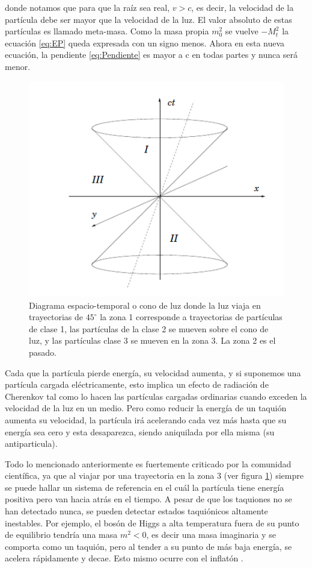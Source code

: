 \documentclass[twocolumn,preprintnumbers,amsmath,amssymb]{revtex4}
\begin{document}
donde notamos que para que la raíz sea real, $v>c$, es decir, la velocidad de la partícula debe ser mayor que la velocidad de la luz. El valor absoluto de estas partículas es llamado meta-masa. Como la masa propia $m_0^2$ se vuelve $-M_t^2$ la ecuación \eqref{eq:EP} queda expresada con un signo menos. Ahora en esta nueva ecuación, la pendiente \eqref{eq:Pendiente} es mayor a c en todas partes y nunca será menor.

\begin{figure}[htb!]
\centering
\includegraphics[width=0.9\columnwidth]{conodeluz2.png}
\caption{ Diagrama espacio-temporal o cono de luz donde la luz viaja en trayectorias de $45^{\circ}$ la zona 1 corresponde a trayectorias de partículas de clase 1, las partículas de la clase 2 se mueven sobre el cono de luz, y las partículas clase 3 se mueven en la zona 3. La zona 2 es el pasado.}
\label{fig:cono}
\end{figure}

Cada que la partícula pierde energía, su velocidad aumenta, y si suponemos una partícula cargada eléctricamente, esto implica un efecto de radiación de Cherenkov tal como lo hacen las partículas cargadas ordinarias cuando exceden la velocidad de la luz en un medio. Pero como reducir la energía de un taquión aumenta su velocidad, la partícula irá acelerando cada vez más hasta que su energía sea cero y esta desaparezca, siendo aniquilada por ella misma (su antiparticula).


Todo lo mencionado anteriormente es fuertemente criticado por la comunidad científica, ya que al viajar por una trayectoria en la zona 3 (ver figura \ref{fig:cono}) siempre se puede hallar un sistema de referencia en el cuál la partícula tiene energía positiva pero van hacia atrás en el tiempo.
A pesar de que los taquiones no se han detectado nunca, se pueden detectar estados taquiónicos altamente inestables. Por ejemplo, el bosón de Higgs a alta temperatura fuera de su punto de equilibrio tendría una masa $m^2 <0$, es decir una masa imaginaria y se comporta como un taquión, pero al tender a su punto de más baja energía, se acelera rápidamente y decae. Esto mismo ocurre con el inflatón \cite{nanni2018particle,kostelecky1988static,mazumdar2001assisted}.
\end{document}
